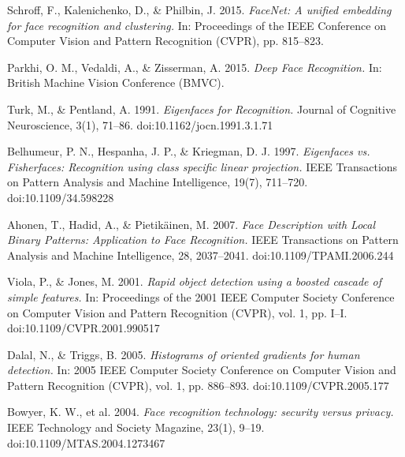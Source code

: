 \begin{thebibliography}{99}


Schroff, F., Kalenichenko, D., \& Philbin, J. 2015. \emph{FaceNet: A unified embedding for face recognition and clustering.} In: Proceedings of the IEEE Conference on Computer Vision and Pattern Recognition (CVPR), pp. 815--823.

Parkhi, O. M., Vedaldi, A., \& Zisserman, A. 2015. \emph{Deep Face Recognition.} In: British Machine Vision Conference (BMVC).

Turk, M., \& Pentland, A. 1991. \emph{Eigenfaces for Recognition.} Journal of Cognitive Neuroscience, 3(1), 71--86. doi:10.1162/jocn.1991.3.1.71

Belhumeur, P. N., Hespanha, J. P., \& Kriegman, D. J. 1997. \emph{Eigenfaces vs. Fisherfaces: Recognition using class specific linear projection.} IEEE Transactions on Pattern Analysis and Machine Intelligence, 19(7), 711--720. doi:10.1109/34.598228

Ahonen, T., Hadid, A., \& Pietikäinen, M. 2007. \emph{Face Description with Local Binary Patterns: Application to Face Recognition.} IEEE Transactions on Pattern Analysis and Machine Intelligence, 28, 2037--2041. doi:10.1109/TPAMI.2006.244

Viola, P., \& Jones, M. 2001. \emph{Rapid object detection using a boosted cascade of simple features.} In: Proceedings of the 2001 IEEE Computer Society Conference on Computer Vision and Pattern Recognition (CVPR), vol. 1, pp. I--I. doi:10.1109/CVPR.2001.990517

Dalal, N., \& Triggs, B. 2005. \emph{Histograms of oriented gradients for human detection.} In: 2005 IEEE Computer Society Conference on Computer Vision and Pattern Recognition (CVPR), vol. 1, pp. 886--893. doi:10.1109/CVPR.2005.177

Bowyer, K. W., et al. 2004. \emph{Face recognition technology: security versus privacy.} IEEE Technology and Society Magazine, 23(1), 9--19. doi:10.1109/MTAS.2004.1273467


\end{thebibliography}
